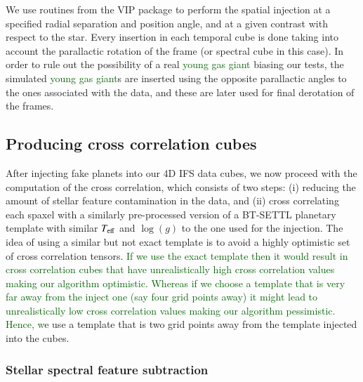 \documentclass{aa}
\newcommand{\newchange}[1]{\textcolor{darkgreen}{#1}}
\begin{document}
We use routines from the \textsc{VIP} package to perform the spatial injection at a specified radial separation and position angle, and at a given contrast with respect to the star.
Every insertion in each temporal cube is done taking into account the parallactic rotation of the frame (or spectral cube in this case).
In order to rule out the possibility of a real \newchange{young gas giant} biasing our tests, the simulated \newchange{young gas giant}s are inserted using the opposite parallactic angles to the ones associated with the data, and these are later used for final derotation of the frames.


\subsection{Producing cross correlation cubes}\label{sec:specpreproc}

After injecting fake planets into our 4D IFS data cubes, we now proceed with the computation of the cross correlation, which consists of two steps: (i) reducing the amount of stellar feature contamination in the data, and (ii) cross correlating each spaxel with a similarly pre-processed version of a BT-SETTL planetary template with similar $T_{\rm eff}$ and $\log(g)$ to the one used for the injection.
The idea of using a similar but not exact template is to avoid a highly optimistic set of cross correlation tensors.
\newchange{If we use the exact template then it would result in cross correlation cubes that have unrealistically high cross correlation values making our algorithm optimistic. 
Whereas if we choose a template that is very far away from the inject one (say four grid points away) it might lead to unrealistically low cross correlation values making our algorithm pessimistic.}
\newchange{Hence, w}e use a template that is two grid points away from the template injected into the cubes.

\subsubsection{Stellar spectral feature subtraction}
\end{document}
